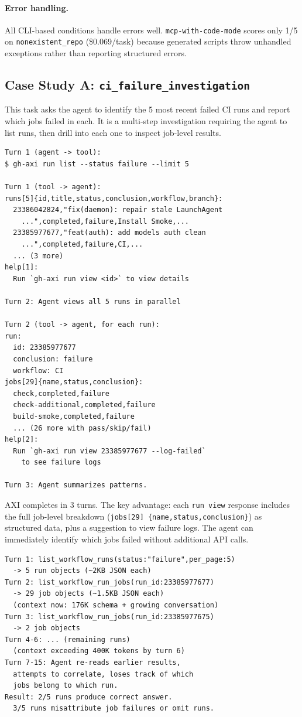 \documentclass{article}
\begin{document}
\paragraph{Error handling.}
All CLI-based conditions handle errors well. \texttt{mcp-with-code-mode} scores only 1/5 on
\texttt{nonexistent\_repo} (\$0.069/task) because generated scripts throw
unhandled exceptions rather than reporting structured errors.

\subsection{Case Study A: \texttt{ci\_failure\_investigation}}

This task asks the agent to identify the 5 most recent failed CI runs and
report which jobs failed in each. It is a multi-step investigation requiring
the agent to list runs, then drill into each one to inspect job-level results.

\begin{lstlisting}[caption={AXI: 3 turns, \$0.065, 21s (SUCCESS).},label=lst:axi-ci]
Turn 1 (agent -> tool):
$ gh-axi run list --status failure --limit 5

Turn 1 (tool -> agent):
runs[5]{id,title,status,conclusion,workflow,branch}:
  23386042824,"fix(daemon): repair stale LaunchAgent
    ...",completed,failure,Install Smoke,...
  23385977677,"feat(auth): add models auth clean
    ...",completed,failure,CI,...
  ... (3 more)
help[1]:
  Run `gh-axi run view <id>` to view details

Turn 2: Agent views all 5 runs in parallel

Turn 2 (tool -> agent, for each run):
run:
  id: 23385977677
  conclusion: failure
  workflow: CI
jobs[29]{name,status,conclusion}:
  check,completed,failure
  check-additional,completed,failure
  build-smoke,completed,failure
  ... (26 more with pass/skip/fail)
help[2]:
  Run `gh-axi run view 23385977677 --log-failed`
    to see failure logs

Turn 3: Agent summarizes patterns.
\end{lstlisting}

AXI completes in 3 turns. The key advantage: each \texttt{run view}
response includes the full job-level breakdown (\texttt{jobs[29]
\{name,status,conclusion\}}) as structured data, plus a suggestion to
view failure logs. The agent can immediately identify which jobs failed
without additional API calls.

\begin{lstlisting}[caption={\texttt{mcp-no-toolsearch}: 15 turns, \$0.758, 177s (FAIL 2/5).}]
Turn 1: list_workflow_runs(status:"failure",per_page:5)
  -> 5 run objects (~2KB JSON each)
Turn 2: list_workflow_run_jobs(run_id:23385977677)
  -> 29 job objects (~1.5KB JSON each)
  (context now: 176K schema + growing conversation)
Turn 3: list_workflow_run_jobs(run_id:23385977675)
  -> 2 job objects
Turn 4-6: ... (remaining runs)
  (context exceeding 400K tokens by turn 6)
Turn 7-15: Agent re-reads earlier results,
  attempts to correlate, loses track of which
  jobs belong to which run.
Result: 2/5 runs produce correct answer.
  3/5 runs misattribute job failures or omit runs.
\end{lstlisting}
\end{document}
